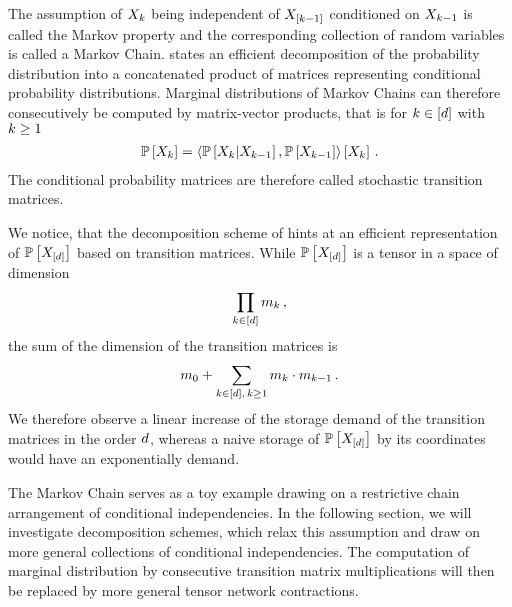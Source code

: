 The assumption of $X_{k}$ being independent of $X_{[k-1]}$ conditioned on $X_{k-1}$ is called the Markov property and the corresponding collection of random variables is called a Markov Chain.
 states an efficient decomposition of the probability distribution into a concatenated product of matrices representing conditional probability distributions.
Marginal distributions of Markov Chains can therefore consecutively be computed by matrix-vector products, that is for $k\in[d]$ with $k\geq1$
\begin{align*}
    \mathbb{P}\left[X_{k}\right]
    = \left\langle \mathbb{P}\left[X_{k}|X_{k-1}\right],\mathbb{P}\left[X_{k-1}\right]\right\rangle \left[ X_{k} \right] \, .
\end{align*}
The conditional probability matrices are therefore called stochastic transition matrices.

We notice, that the decomposition scheme of  hints at an efficient representation of $\mathbb{P}\left[X_{[d]}\right]$ based on transition matrices.
While $\mathbb{P}\left[X_{[d]}\right]$ is a tensor in a space of dimension
\begin{align*}
    \prod_{k\in[d]} m_{k} \, ,
\end{align*}
the sum of the dimension of the transition matrices is
\begin{align*}
    m_{0} + \sum_{k\in[d],\, k\geq 1} m_{k}\cdot m_{k-1} \, .
\end{align*}
We therefore observe a linear increase of the storage demand of the transition matrices in the order $d$, whereas a naive storage of $\mathbb{P}\left[X_{[d]}\right]$ by its coordinates would have an exponentially demand.

The Markov Chain serves as a toy example drawing on a restrictive chain arrangement of conditional independencies.
In the following section, we will investigate decomposition schemes, which relax this assumption and draw on more general collections of conditional independencies.
The computation of marginal distribution by consecutive transition matrix multiplications will then be replaced by more general tensor network contractions.



\label{sec:exponentialFamilies}

